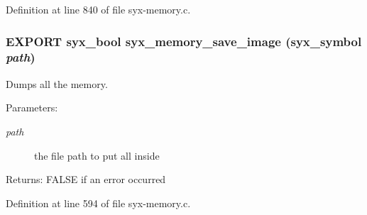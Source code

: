 Definition at line 840 of file syx-memory.c.\hypertarget{syx-memory_8h_b5e20fcf4ca01f3925d67c4854209ba3}{
\subsubsection{\setlength{\rightskip}{0pt plus 5cm}EXPORT {\bf syx\_\-bool} syx\_\-memory\_\-save\_\-image ({\bf syx\_\-symbol} {\em path})}}
\label{syx-memory_8h_b5e20fcf4ca01f3925d67c4854209ba3}


Dumps all the memory.

\begin{Desc}
\item[Parameters:]
\begin{description}
\item[{\em path}]the file path to put all inside \end{description}
\end{Desc}
\begin{Desc}
\item[Returns:]FALSE if an error occurred \end{Desc}


Definition at line 594 of file syx-memory.c.